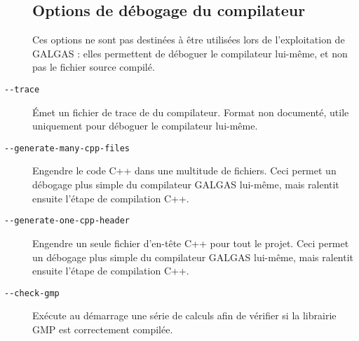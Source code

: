 \begin{description}
\subsection{Options de débogage du compilateur}

Ces options ne sont pas destinées à être utilisées lors de l'exploitation de GALGAS : elles permettent de déboguer le compilateur lui-même, et non pas le fichier source compilé.


  \item[\texttt{-{-}trace}] Émet un fichier de trace de du compilateur. Format non documenté, utile uniquement pour déboguer le compilateur lui-même.


  \item[\texttt{-{-}generate-many-cpp-files}] Engendre le code C++ dans une multitude de fichiers. Ceci permet un débogage plus simple du compilateur GALGAS lui-même, mais ralentit ensuite l'étape de compilation C++.


  \item[\texttt{-{-}generate-one-cpp-header}] Engendre un seule fichier d'en-tête C++ pour tout le projet. Ceci permet un débogage plus simple du compilateur GALGAS lui-même, mais ralentit ensuite l'étape de compilation C++.


  \item[\texttt{-{-}check-gmp}] Exécute au démarrage une série de calculs afin de vérifier si la librairie GMP est correctement compilée.

\end{description}

